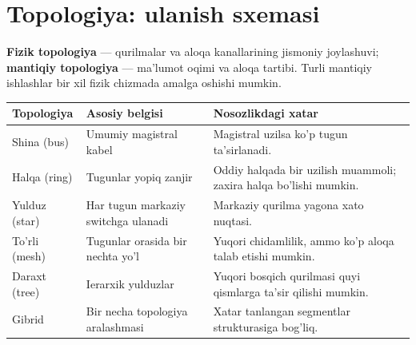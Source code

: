 \documentclass[11pt,a4paper,oneside]{book}
\newcommand{\kw}[1]{\textbf{\color{Deep}#1}}
\begin{document}
\section{Topologiya: ulanish sxemasi}
\kw{Fizik topologiya} — qurilmalar va aloqa kanallarining jismoniy joylashuvi; \kw{mantiqiy topologiya} — ma'lumot oqimi va aloqa tartibi. Turli mantiqiy ishlashlar bir xil fizik chizmada amalga oshishi mumkin.
\par\medskip
\par\medskip
\begin{tabularx}{\textwidth}{p{}YY}\toprule
Topologiya & Asosiy belgisi & Nosozlikdagi xatar\\\midrule
Shina (bus) & Umumiy magistral kabel & Magistral uzilsa ko'p tugun ta'sirlanadi.\\
Halqa (ring) & Tugunlar yopiq zanjir & Oddiy halqada bir uzilish muammoli; zaxira halqa bo'lishi mumkin.\\
Yulduz (star) & Har tugun markaziy switchga ulanadi & Markaziy qurilma yagona xato nuqtasi.\\
To'rli (mesh) & Tugunlar orasida bir nechta yo'l & Yuqori chidamlilik, ammo ko'p aloqa talab etishi mumkin.\\
Daraxt (tree) & Ierarxik yulduzlar & Yuqori bosqich qurilmasi quyi qismlarga ta'sir qilishi mumkin.\\
Gibrid & Bir necha topologiya aralashmasi & Xatar tanlangan segmentlar strukturasiga bog'liq.\\\bottomrule\end{tabularx}
\begin{center}\end{center}
\end{document}
